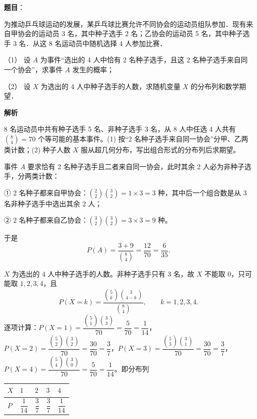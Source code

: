 \begin{answer}

\textbf{题目}：

为推动乒乓球运动的发展，某乒乓球比赛允许不同协会的运动员组队参加．现有来自甲协会的运动员 3 名，其中种子选手 2 名；乙协会的运动员 5 名，其中种子选手 3 名．从这 8 名运动员中随机选择 4 人参加比赛．

（1） 设 \(A\) 为事件“选出的 4 人中恰有 2 名种子选手，且这 2 名种子选手来自同一个协会”，求事件 \(A\) 发生的概率；

（2） 设 \(X\) 为选出的 4 人中种子选手的人数，求随机变量 \(X\) 的分布列和数学期望．

\textbf{解析}

8 名运动员中共有种子选手 5 名、非种子选手 3 名，从 8 人中任选 4 人共有 \(\binom{8}{4}=70\) 个等可能的基本事件。(1) 按“2 名种子选手来自同一协会”分甲、乙两类计数；(2) 种子人数 \(X\) 服从超几何分布，写出组合形式的分布列后求期望。


事件 \(A\) 要求恰有 2 名种子选手且二者来自同一协会，此时其余 2 人必为非种子选手，分两类计数：

① 2 名种子都来自甲协会：\(\binom{2}{2}\binom{3}{2}=1\times3=3\) 种，其中后一个组合数是从 3 名非种子选手中选出其余 2 人；

② 2 名种子都来自乙协会：\(\binom{3}{2}\binom{3}{2}=3\times3=9\) 种。

于是
\nopagebreak[4]
\[
P(A)=\dfrac{3+9}{\binom{8}{4}}=\dfrac{12}{70}=\dfrac{6}{35}.
\]


\(X\) 为选出的 4 人中种子选手的人数。非种子选手只有 3 名，故 \(X\) 不能取 0，只可能取 \(1,2,3,4\)，且
\nopagebreak[4]
\[
P(X=k)=\dfrac{\binom{5}{k}\binom{3}{4-k}}{\binom{8}{4}},\qquad k=1,2,3,4 .
\]
逐项计算：\(P(X=1)=\dfrac{\binom{5}{1}\binom{3}{3}}{70}=\dfrac{5}{70}=\dfrac{1}{14}\)，\(P(X=2)=\dfrac{\binom{5}{2}\binom{3}{2}}{70}=\dfrac{30}{70}=\dfrac{3}{7}\)，\(P(X=3)=\dfrac{\binom{5}{3}\binom{3}{1}}{70}=\dfrac{30}{70}=\dfrac{3}{7}\)，\(P(X=4)=\dfrac{\binom{5}{4}\binom{3}{0}}{70}=\dfrac{5}{70}=\dfrac{1}{14}\)。即分布列

\begin{center}
\begin{tabular}{lllll}
\toprule
\(X\) & \(1\) & \(2\) & \(3\) & \(4\) \\
\midrule
\(P\) & \(\dfrac{1}{14}\) & \(\dfrac{3}{7}\) & \(\dfrac{3}{7}\) & \(\dfrac{1}{14}\) \\
\bottomrule
\end{tabular}
\end{center}


\end{answer}
